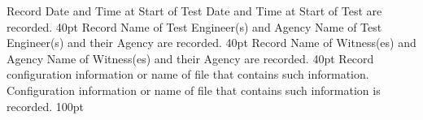 %
\tpStep%
{Record Date and Time at Start of Test}
{Date and Time at Start of Test are recorded.}
{40pt}
%
\tpStep%
{Record Name of Test Engineer(s) and Agency}
{Name of Test Engineer(s) and their Agency are recorded.}
{40pt}
%
\tpStep%
{Record Name of Witness(es) and Agency}
{Name of Witness(es) and their Agency are recorded.}
{40pt}
%
\tpStep%
{Record configuration information or name of file that contains such information.}
{Configuration information or name of file that contains such information is recorded.}
{100pt}
%
